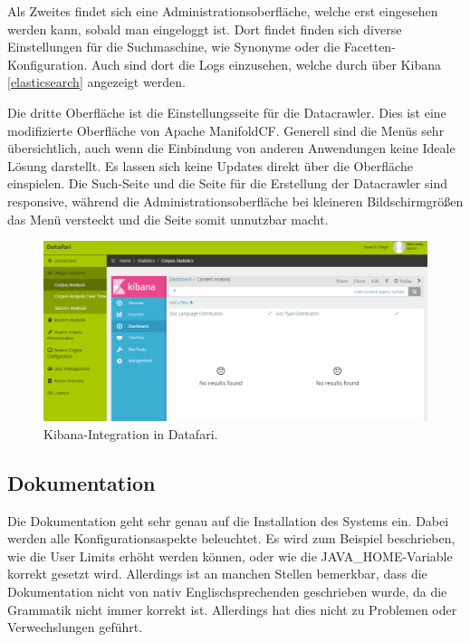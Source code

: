 Als Zweites findet sich eine Administrationsoberfläche, welche erst eingesehen werden kann, sobald man eingeloggt ist. Dort findet finden sich diverse Einstellungen für die Suchmaschine, wie Synonyme oder die Facetten-Konfiguration. Auch sind dort die Logs einzusehen, welche durch über Kibana \ref{elasticsearch} angezeigt werden. 

Die dritte Oberfläche ist die Einstellungsseite für die Datacrawler. Dies ist eine modifizierte Oberfläche von Apache ManifoldCF. Generell sind die Menüs sehr übersichtlich, auch wenn die Einbindung von anderen Anwendungen keine Ideale Lösung darstellt. Es lassen sich keine Updates direkt über die Oberfläche einspielen.
Die Such-Seite und die Seite für die Erstellung der Datacrawler sind responsive, während die Administrationsoberfläche bei kleineren Bildschirmgrößen das Menü versteckt und die Seite somit unnutzbar macht.

\begin{figure}
	\centering
	\includegraphics[width=1\linewidth]{images/datafari_kibana.png}
	\caption{Kibana-Integration in Datafari.}
	\label{img:datafariKibana}
\end{figure}

\subsection{Dokumentation}

Die Dokumentation geht sehr genau auf die Installation des Systems ein. Dabei werden alle Konfigurationsaspekte beleuchtet. Es wird zum Beispiel beschrieben, wie die User Limits erhöht werden können, oder wie die JAVA\_HOME-Variable korrekt gesetzt wird. Allerdings ist an manchen Stellen bemerkbar, dass die Dokumentation nicht von nativ Englischsprechenden geschrieben wurde, da die Grammatik nicht immer korrekt ist. Allerdings hat dies nicht zu Problemen oder Verwechslungen geführt.

